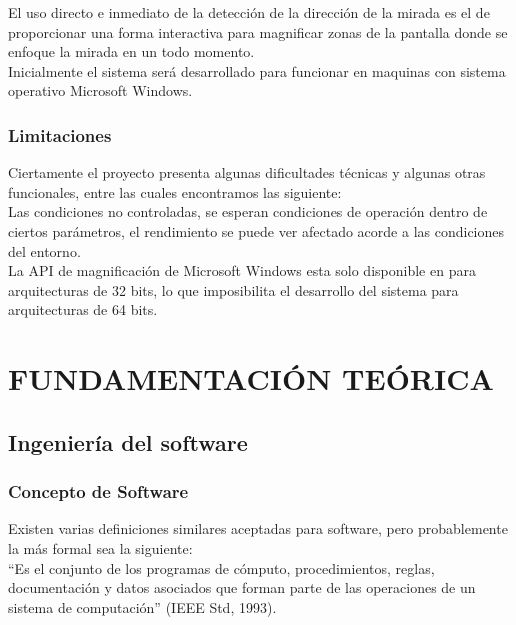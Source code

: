 \documentclass[12pt]{book} %
\begin{document}
		El uso directo e inmediato de la detección de la dirección de la mirada es el de proporcionar una forma interactiva 
		para magnificar zonas de la pantalla donde se enfoque la mirada en un todo momento.\\
		
		Inicialmente el sistema será desarrollado para funcionar en maquinas con sistema operativo Microsoft Windows.\\
		
	\subsection{Limitaciones}
		Ciertamente el proyecto presenta algunas dificultades técnicas y algunas otras funcionales, entre las cuales encontramos
		las siguiente:\\
		
		Las condiciones no controladas, se esperan condiciones de operación dentro de ciertos parámetros, el rendimiento se puede 
		ver afectado acorde a las condiciones del entorno.\\
		
		La API de magnificación de Microsoft Windows esta solo disponible en para arquitecturas de 32 bits, lo que imposibilita el desarrollo
		del sistema para arquitecturas de 64 bits.\\
	
		
		 

\chapter{FUNDAMENTACIÓN TEÓRICA}
\thispagestyle{empty}
\newpage
\section{Ingeniería del software}
	\subsection{Concepto de Software}
		Existen varias definiciones similares aceptadas para software, pero probablemente la más formal sea la siguiente:\\
		
		“Es el conjunto de los programas de cómputo, procedimientos, reglas, documentación y datos asociados que forman parte de las
		operaciones de un sistema de computación” (IEEE Std, 1993).\\
		
\end{document}
